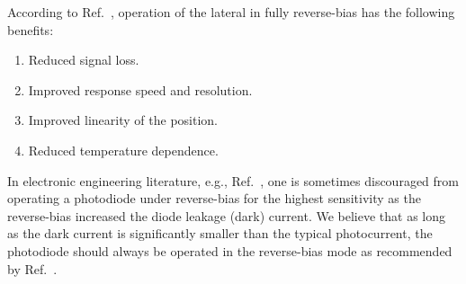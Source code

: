According to Ref.~\cite{Woltring75}, operation of the lateral in fully reverse-bias has the following benefits:
\begin{enumerate}
	\item Reduced signal loss.
	\item Improved response speed and resolution.
	\item Improved linearity of the position.
	\item Reduced temperature dependence.
\end{enumerate}
In electronic engineering literature, e.g., Ref.~\cite[p.~258]{Jung05}, one is sometimes discouraged from operating a photodiode under reverse-bias for the highest sensitivity as the reverse-bias increased the diode leakage (dark) current.
We believe that as long as the dark current is significantly smaller than the typical photocurrent, the photodiode should always be operated in the reverse-bias mode as recommended by Ref.~\cite{Noorlag74,Woltring75,Wang89,Hobbs11}.

